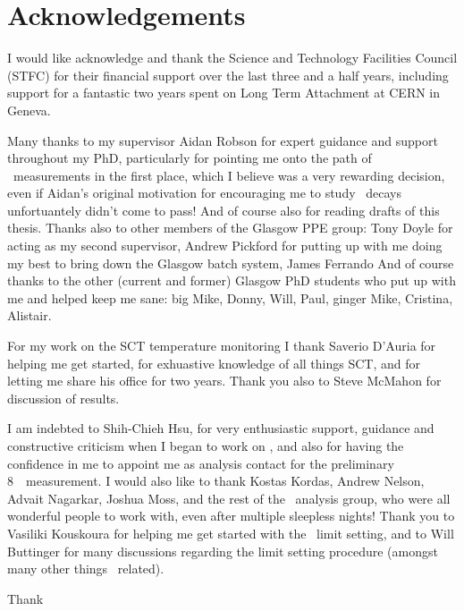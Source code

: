 \chapter*{Acknowledgements}
I would like acknowledge and thank the Science and Technology Facilities Council
(STFC) for their financial support over the last three and a half years,
including support for a fantastic two years spent on Long Term Attachment at CERN
in Geneva.

Many thanks to my supervisor Aidan Robson for expert guidance and support throughout my
PhD, particularly for pointing me onto the path of \ZZ\ measurements in the first
place, which I believe was a very rewarding decision, even if Aidan's original
motivation for encouraging me to study \ZZ\ decays unfortuantely didn't come to
pass! And of course also for reading drafts of this thesis. Thanks also to other
members of the Glasgow PPE group: Tony Doyle for acting as my second supervisor,
Andrew Pickford for putting up with me doing my best to bring down the Glasgow
batch system, James Ferrando
And of course thanks to the other (current and former) Glasgow PhD students who put up with me and
helped keep me sane: big Mike, Donny, Will, Paul, ginger Mike, Cristina,
Alistair.

For my work on the SCT temperature monitoring I thank Saverio D'Auria
for helping me get started, for exhuastive knowledge of all things SCT, and for
letting me share his office for two years. Thank you also to Steve McMahon for
discussion of results.

I am indebted to Shih-Chieh Hsu, for very enthusiastic
support, guidance and constructive criticism when I began to work on \ZZ, and
also for having the confidence in me to appoint me as analysis contact for the
preliminary 8~\tev\ measurement. I would also like to thank Kostas Kordas,
Andrew Nelson, Advait Nagarkar, Joshua Moss, and the rest of the \ZZ\ analysis
group, who were all wonderful people to work with, even after multiple sleepless
nights! Thank you to Vasiliki Kouskoura for helping me get started with the
\TGC\ limit setting, and to Will Buttinger for many discussions regarding the
limit setting procedure (amongst many other things \ZZ\ related).

Thank
